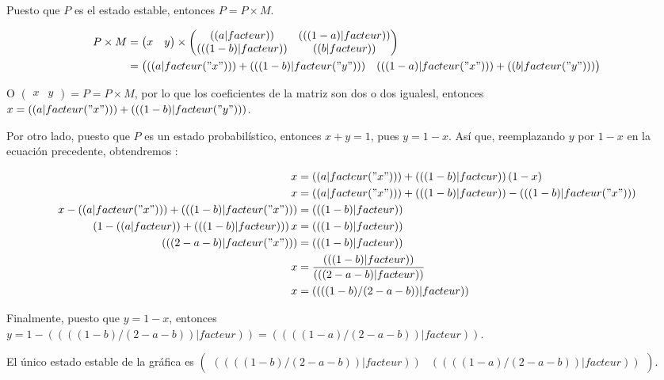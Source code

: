 \exercice*
Puesto que $P$ es el estado estable, entonces $P=P\times M$.

\begin{align*}
    P\times M &= \begin{pmatrix}x&y\end{pmatrix}\times
\begin{pmatrix}
  (( a|facteur )) & (( (1-a)|facteur )) \\
  (( (1-b)|facteur )) & (( b|facteur )) \\
\end{pmatrix}\\
&= \begin{pmatrix}
  (( a|facteur("x") )) + (( (1-b)|facteur("y") )) & (( (1-a)|facteur("x") )) + (( b|facteur("y") ))
\end{pmatrix}
\end{align*}

O $\begin{pmatrix}x&y\end{pmatrix}=P=P\times M$, por lo que los coeficientes de la matriz son dos o dos igualesl, entonces $x=(( a|facteur("x") )) + (( (1-b)|facteur("y") ))$.

Por otro lado, puesto que $P$ es un estado probabilístico, entonces $x+y=1$, pues $y=1-x$. Así que, reemplazando $y$ por $1-x$ en la ecuación precedente, obtendremos :

\begin{align*}
  x &= (( a|facteur("x") )) + (( (1-b)|facteur ))\,(1-x) \\
  x &= (( a|facteur("x") )) + (( (1-b)|facteur )) - (( (1-b)|facteur("x") ))\\
  x-(( a|facteur("x") )) +(( (1-b)|facteur("x") )) &= (( (1-b)|facteur ))\\
  (1-(( a|facteur ))+(( (1-b)|facteur ))) \,x &= (( (1-b)|facteur ))\\
  (( (2-a-b)|facteur("x") )) &= (( (1-b)|facteur ))\\
  x &= \frac{(( (1-b)|facteur ))}{(( (2-a-b)|facteur ))}\\
x &= (( ((1-b)/(2-a-b))|facteur ))
\end{align*}

Finalmente, puesto que $y=1-x$, entonces $y=1-(( ((1-b)/(2-a-b))|facteur ))=(( ((1-a)/(2-a-b))|facteur ))$.

El único estado estable de la gráfica es $\begin{pmatrix}
(( ((1-b)/(2-a-b))|facteur )) &
(( ((1-a)/(2-a-b))|facteur ))
\end{pmatrix}$.
